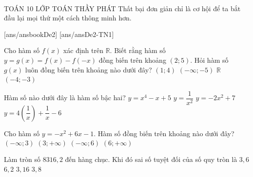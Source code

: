 ﻿﻿\begin{name}
	{\tenchude}
	{TOÁN 10}
	{LỚP TOÁN THẦY PHÁT}
	{Thất bại đơn giản chỉ là cơ hội để ta bắt đầu lại mọi thứ một cách thông minh hơn.}
\end{name}
[ans/ansbookDe2]
\TN
{}[ans/ansDe2-TN1]
\begin{ex}%
	Cho hàm số $ f(x) $ xác định trên $ \mathbb{R} $. Biết rằng hàm số $ y = g(x) = f(x) - f(-x) $ đồng biến trên khoảng $(2;5)$. Hỏi hàm số $ g(x) $ luôn đồng biến trên khoảng nào dưới đây?
	\choice
	{$(1;4)$}
	{$(-\infty;-5)$}
	{$\mathbb{R}$}
	{\True $(-4;-3)$}
\end{ex}

\begin{ex}%
	Hàm số nào dưới đây là hàm số bậc hai?
	\choice
	{$y=x^4-x+5$}
	{$y=\dfrac{1}{x^2}$}
	{\True $y=-2x^2+7$}
	{$y=4\left(\dfrac{1}{x}\right)+\dfrac{1}{x}-6$}
\end{ex}

\begin{ex}%
	Cho hàm số $y=-x^2+6x-1$. Hàm số đồng biến trên khoảng nào dưới đây?
	\choice
	{\True $(-\infty;3)$}
	{$(3;+\infty)$}
	{$(-\infty;6)$}
	{$(6;+\infty)$}
\end{ex}

\begin{ex}%
	Làm tròn số $8316{,}2$ đến hàng chục. Khi đó sai số tuyệt đối của số quy tròn là
	\choice
	{$3{,}6$}
	{$6{,}2$}
	{$3{,}16$}
	{\True $3{,}8$}
\end{ex}

